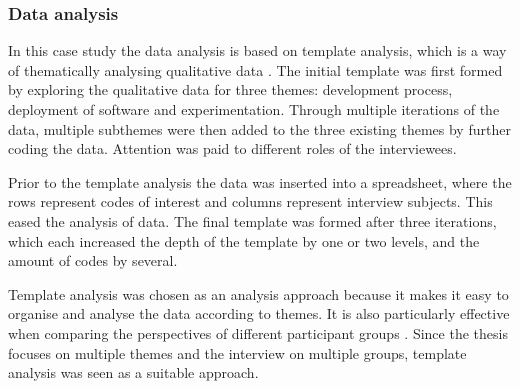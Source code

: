 \documentclass[english]{tktltiki2}
\theoremstyle{definition}
\theoremstyle{remark}
\begin{document}
\subsubsection{Data analysis} %
In this case study the data analysis is based on template analysis, which is a way of thematically analysing qualitative data \cite{king1998template}. The initial template was first formed by exploring the qualitative data for three themes: development process, deployment of software and experimentation. Through multiple iterations of the data, multiple subthemes were then added to the three existing themes by further coding the data. Attention was paid to different roles of the interviewees.

Prior to the template analysis the data was inserted into a spreadsheet, where the rows represent codes of interest and columns represent interview subjects. This eased the analysis of data. The final template was formed after three iterations, which each increased the depth of the template by one or two levels, and the amount of codes by several.  

Template analysis was chosen as an analysis approach because it makes it easy to organise and analyse the data according to themes. It is also particularly effective when comparing the perspectives of different participant groups \cite{king2004using}. Since the thesis focuses on multiple themes and the interview on multiple groups, template analysis was seen as a suitable approach.   


\end{document}
